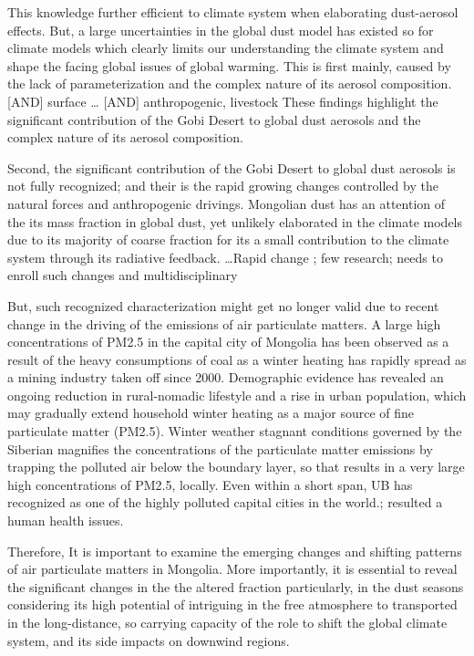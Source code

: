 \documentclass[
  11pt,
]{article}
\begin{document}
\newpage

This knowledge further efficient to climate system when elaborating
dust-aerosol effects. But, a large uncertainties in the global dust
model has existed so for climate models which clearly limits our
understanding the climate system and shape the facing global issues of
global warming. This is first mainly, caused by the lack of
parameterization and the complex nature of its aerosol composition.
{[}AND{]} surface \ldots{} {[}AND{]} anthropogenic, livestock These
findings highlight the significant contribution of the Gobi Desert to
global dust aerosols and the complex nature of its aerosol composition.

Second, the significant contribution of the Gobi Desert to global dust
aerosols is not fully recognized; and their is the rapid growing changes
controlled by the natural forces and anthropogenic drivings. Mongolian
dust has an attention of the its mass fraction in global dust, yet
unlikely elaborated in the climate models due to its majority of coarse
fraction for its a small contribution to the climate system through its
radiative feedback. \ldots Rapid change ; few research; needs to enroll
such changes and multidisciplinary

But, such recognized characterization might get no longer valid due to
recent change in the driving of the emissions of air particulate
matters. A large high concentrations of PM2.5 in the capital city of
Mongolia has been observed as a result of the heavy consumptions of coal
as a winter heating has rapidly spread as a mining industry taken off
since 2000. Demographic evidence has revealed an ongoing reduction in
rural-nomadic lifestyle and a rise in urban population, which may
gradually extend household winter heating as a major source of fine
particulate matter (PM2.5). Winter weather stagnant conditions governed
by the Siberian magnifies the concentrations of the particulate matter
emissions by trapping the polluted air below the boundary layer, so that
results in a very large high concentrations of PM2.5, locally. Even
within a short span, UB has recognized as one of the highly polluted
capital cities in the world.; resulted a human health issues.

Therefore, It is important to examine the emerging changes and shifting
patterns of air particulate matters in Mongolia. More importantly, it is
essential to reveal the significant changes in the the altered fraction
particularly, in the dust seasons considering its high potential of
intriguing in the free atmosphere to transported in the long-distance,
so carrying capacity of the role to shift the global climate system, and
its side impacts on downwind regions.
\end{document}
